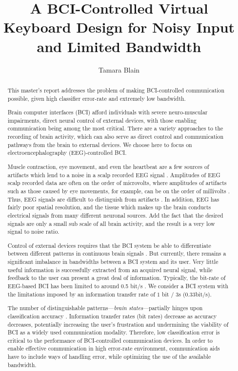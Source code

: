 \documentclass[12pt,titlepage]{article}
\begin{document}
\title{A BCI-Controlled Virtual Keyboard Design for Noisy Input and Limited Bandwidth} %
\author{Tamara Blain}
\maketitle

\begin{abstract}
This master's report addresses the problem of making BCI-controlled communication possible, given high classifier error-rate and extremely low bandwidth.

Brain computer interfaces (BCI) afford individuals with severe neuro-muscular impairments, direct neural control of external devices, with those enabling communication being among the most critical.  There are a variety approaches to the recording of brain activity, which can also serve as direct control and communication pathways from the brain to external devices.  We choose here to focus on electroencephalography (EEG)-controlled BCI.

Muscle contraction, eye movement, and even the heartbeat are a few sources of artifacts which lend to a noise in a scalp recorded EEG signal \cite{nunez_electric_2005}.  Amplitudes of EEG scalp recorded data are often on the order of microvolts, where amplitudes of artifacts such as those caused by eye movements, for example, can be on the order of millivolts \cite{tatum2007handbook}.  Thus, EEG signals are difficult to distinguish from artifacts \cite{nunez_electric_2005}.  In addition, EEG has fairly poor spatial resolution, and the tissue which makes up the brain conducts electrical signals from many 
different neuronal sources.  Add the fact that the desired signals are only a small sub scale of all 
brain activity, and the result is a very low signal to noise ratio.

Control of external devices requires that the BCI system be able to differentiate between different patterns in continuous brain signals \cite{lotte_review_2007}.  But currently, there remains a significant imbalance in bandwidths between a BCI system and its user.  Very little useful information is successfully extracted from an acquired neural signal, while feedback to the user can present a 
great deal of information.  Typically, the bit-rate of EEG-based BCI has been limited to around 0.5 bit/s \cite{millan2004}.  We consider a BCI system with the limitations imposed by an information transfer rate of $1$ bit $/$ $3$s (0.33bit/s).

The number of distinguishable patterns---\emph{brain states}---partially hinges upon classification 
accuracy \cite{lotte_review_2007}.  Information transfer rates (bit rates) decrease as accuracy decreases, potentially increasing the user's frustration and  undermining the viability of BCI as a widely used communication modality.  Therefore, low classification error is critical to the performance of BCI-controlled communication devices.  In order to enable effective communication in high error-rate environment, communication aids have to include ways of handling error, while optimizing the use of the available bandwidth.


\end{abstract}
\end{document}
